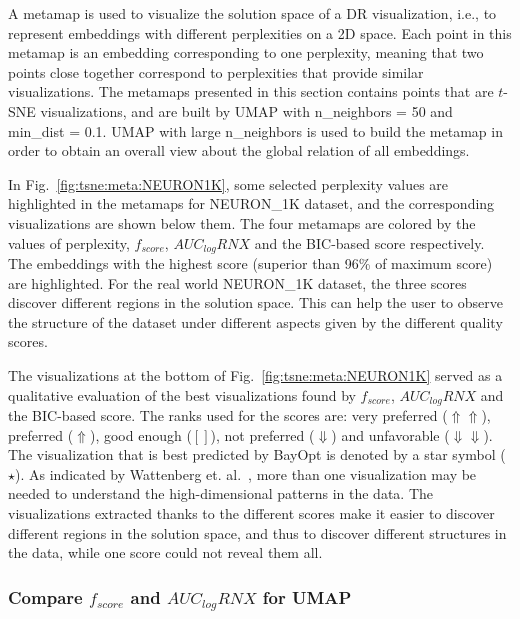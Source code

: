 A metamap is used to visualize the solution space of a DR visualization, i.e., to represent embeddings with different perplexities on a 2D space.
Each point in this metamap is an embedding corresponding to one perplexity, meaning that two points close together correspond to perplexities that provide similar visualizations.
The metamaps presented in this section contains points that are $t$-SNE visualizations, and are built by UMAP with {n\_neighbors} = 50 and {min\_dist} = 0.1.
UMAP with large {n\_neighbors} is used to build the metamap in order to obtain an overall view about the global relation of all embeddings.

In Fig.~\ref{fig:tsne:meta:NEURON1K}, some selected perplexity values are highlighted in the metamaps for {NEURON\_1K} dataset, and the corresponding visualizations are shown below them.
The four metamaps are colored by the values of perplexity, $f_{score}$, $AUC_{log}RNX$ and the BIC-based score respectively.
The embeddings with the highest score (superior than 96\% of maximum score) are highlighted.
For the real world {NEURON\_1K} dataset, the three scores discover different regions in the solution space. This can help the user to observe the structure of the dataset under different aspects given by the different quality scores.

The visualizations at the bottom of Fig.~\ref{fig:tsne:meta:NEURON1K} served as a qualitative evaluation of the best visualizations found by $f_{score}$, $AUC_{log}RNX$ and the BIC-based score.
The ranks used for the scores are: very preferred ($\Uparrow\Uparrow$), preferred ($\Uparrow$), good enough ($[]$), not preferred ($\Downarrow$) and unfavorable ($\Downarrow\Downarrow$).
The visualization that is best predicted by BayOpt is denoted by a star symbol ($\star$).
As indicated by Wattenberg et. al.~\cite{wattenberg2016use}, more than one visualization may be needed to understand the high-dimensional patterns in the data.
The visualizations extracted thanks to the different scores make it easier to discover different regions in the solution space, and thus to discover different structures in the data, while one score could not reveal them all.

\subsubsection{Compare $f_{score}$ and $AUC_{log}RNX$ for UMAP}\label{sec:compare:umap}

